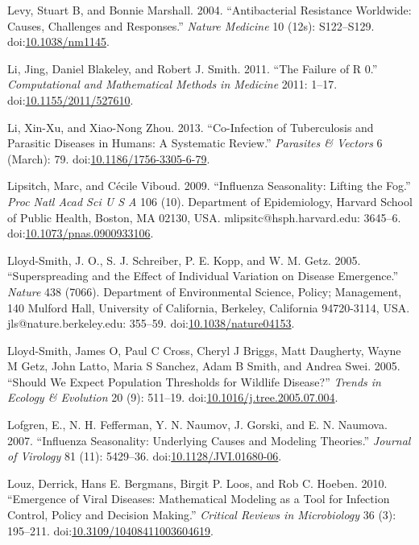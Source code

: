 \documentclass[]{book}
\theoremstyle{definition}
\theoremstyle{definition}
\theoremstyle{definition}
\theoremstyle{remark}
\begin{document}
\hypertarget{ref-levy04}{}
Levy, Stuart B, and Bonnie Marshall. 2004. ``Antibacterial Resistance
Worldwide: Causes, Challenges and Responses.'' \emph{Nature Medicine} 10
(12s): S122--S129.
doi:\href{https://doi.org/10.1038/nm1145}{10.1038/nm1145}.

\hypertarget{ref-li11}{}
Li, Jing, Daniel Blakeley, and Robert J. Smith. 2011. ``The Failure of R
0.'' \emph{Computational and Mathematical Methods in Medicine} 2011:
1--17.
doi:\href{https://doi.org/10.1155/2011/527610}{10.1155/2011/527610}.

\hypertarget{ref-li13}{}
Li, Xin-Xu, and Xiao-Nong Zhou. 2013. ``Co-Infection of Tuberculosis and
Parasitic Diseases in Humans: A Systematic Review.'' \emph{Parasites \&
Vectors} 6 (March): 79.
doi:\href{https://doi.org/10.1186/1756-3305-6-79}{10.1186/1756-3305-6-79}.

\hypertarget{ref-lipsitch09}{}
Lipsitch, Marc, and Cécile Viboud. 2009. ``Influenza Seasonality:
Lifting the Fog.'' \emph{Proc Natl Acad Sci U S A} 106 (10). Department
of Epidemiology, Harvard School of Public Health, Boston, MA 02130, USA.
mlipsitc@hsph.harvard.edu: 3645--6.
doi:\href{https://doi.org/10.1073/pnas.0900933106}{10.1073/pnas.0900933106}.

\hypertarget{ref-lloyd-smith05}{}
Lloyd-Smith, J. O., S. J. Schreiber, P. E. Kopp, and W. M. Getz. 2005.
``Superspreading and the Effect of Individual Variation on Disease
Emergence.'' \emph{Nature} 438 (7066). Department of Environmental
Science, Policy; Management, 140 Mulford Hall, University of California,
Berkeley, California 94720-3114, USA. jls@nature.berkeley.edu: 355--59.
doi:\href{https://doi.org/10.1038/nature04153}{10.1038/nature04153}.

\hypertarget{ref-lloyd-smith05b}{}
Lloyd-Smith, James O, Paul C Cross, Cheryl J Briggs, Matt Daugherty,
Wayne M Getz, John Latto, Maria S Sanchez, Adam B Smith, and Andrea
Swei. 2005. ``Should We Expect Population Thresholds for Wildlife
Disease?'' \emph{Trends in Ecology \& Evolution} 20 (9): 511--19.
doi:\href{https://doi.org/10.1016/j.tree.2005.07.004}{10.1016/j.tree.2005.07.004}.

\hypertarget{ref-lofgren07}{}
Lofgren, E., N. H. Fefferman, Y. N. Naumov, J. Gorski, and E. N.
Naumova. 2007. ``Influenza Seasonality: Underlying Causes and Modeling
Theories.'' \emph{Journal of Virology} 81 (11): 5429--36.
doi:\href{https://doi.org/10.1128/JVI.01680-06}{10.1128/JVI.01680-06}.

\hypertarget{ref-louz10}{}
Louz, Derrick, Hans E. Bergmans, Birgit P. Loos, and Rob C. Hoeben.
2010. ``Emergence of Viral Diseases: Mathematical Modeling as a Tool for
Infection Control, Policy and Decision Making.'' \emph{Critical Reviews
in Microbiology} 36 (3): 195--211.
doi:\href{https://doi.org/10.3109/10408411003604619}{10.3109/10408411003604619}.
\end{document}
